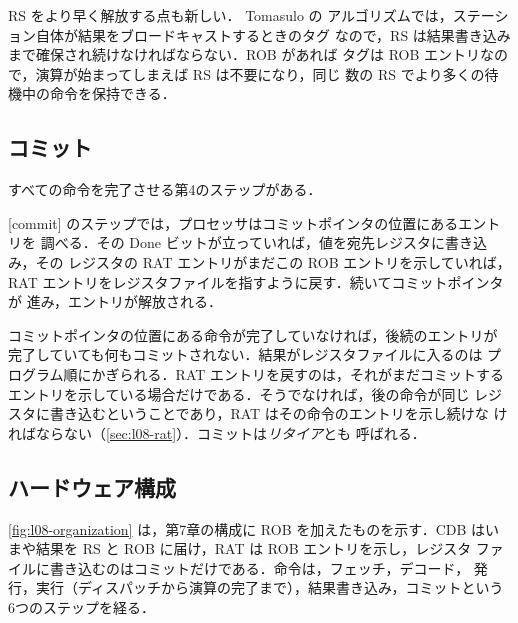 \documentclass[../main.tex]{subfiles}
\begin{document}
RS をより早く解放する点も新しい．%
Tomasulo の
アルゴリズムでは，ステーション自体が結果をブロードキャストするときのタグ
なので，RS は結果書き込みまで確保され続けなければならない．ROB があれば
タグは ROB エントリなので，演算が始まってしまえば RS は不要になり，同じ
数の RS でより多くの待機中の命令を保持できる．

\subsection{コミット}

すべての命令を完了させる第4のステップがある．

\begin{definition}[コミット]
  \label{def:l08-commit}
  [commit]%
  のステップでは，プロセッサはコミットポインタの位置にあるエントリを
  調べる．その Done ビットが立っていれば，値を宛先レジスタに書き込み，その
  レジスタの RAT エントリがまだこの ROB エントリを示していれば，RAT
  エントリをレジスタファイルを指すように戻す．続いてコミットポインタが
  進み，エントリが解放される．
\end{definition}

コミットポインタの位置にある命令が完了していなければ，後続のエントリが
完了していても何もコミットされない．結果がレジスタファイルに入るのは
プログラム順にかぎられる．RAT エントリを戻すのは，それがまだコミットする
エントリを示している場合だけである．そうでなければ，後の命令が同じ
レジスタに書き込むということであり，RAT はその命令のエントリを示し続けな
ければならない（\cref{sec:l08-rat}）．コミットは\emph{リタイア}とも
呼ばれる．

\subsection{ハードウェア構成}

\cref{fig:l08-organization} は，第7章の構成に ROB を加えたものを示す．CDB
はいまや結果を RS と ROB に届け，RAT は ROB エントリを示し，レジスタ
ファイルに書き込むのはコミットだけである．命令は，フェッチ，デコード，
発行，実行（ディスパッチから演算の完了まで），結果書き込み，コミットという
6つのステップを経る．
\end{document}
